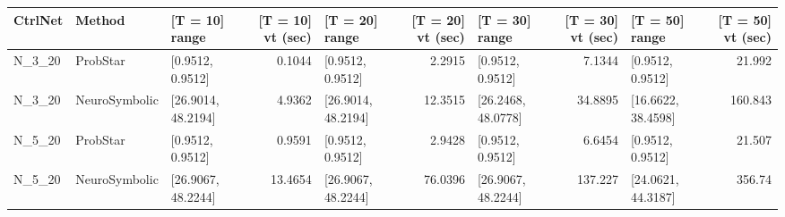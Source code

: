 \begin{tabular}{lllrlrlrlr}
\hline
 CtrlNet   & Method        & [T = 10] range     &   [T = 10] vt (sec) & [T = 20] range     &   [T = 20] vt (sec) & [T = 30] range     &   [T = 30] vt (sec) & [T = 50] range     &   [T = 50] vt (sec) \\
\hline
 N\_3\_20    & ProbStar      & [0.9512, 0.9512]   &              0.1044 & [0.9512, 0.9512]   &              2.2915 & [0.9512, 0.9512]   &              7.1344 & [0.9512, 0.9512]   &              21.992 \\
 N\_3\_20    & NeuroSymbolic & [26.9014, 48.2194] &              4.9362 & [26.9014, 48.2194] &             12.3515 & [26.2468, 48.0778] &             34.8895 & [16.6622, 38.4598] &             160.843 \\
 N\_5\_20    & ProbStar      & [0.9512, 0.9512]   &              0.9591 & [0.9512, 0.9512]   &              2.9428 & [0.9512, 0.9512]   &              6.6454 & [0.9512, 0.9512]   &              21.507 \\
 N\_5\_20    & NeuroSymbolic & [26.9067, 48.2244] &             13.4654 & [26.9067, 48.2244] &             76.0396 & [26.9067, 48.2244] &            137.227  & [24.0621, 44.3187] &             356.74  \\
\hline
\end{tabular}
